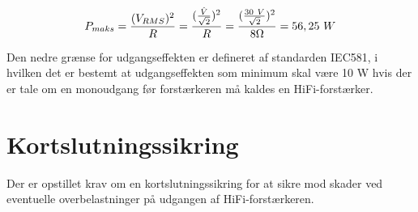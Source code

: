 \begin{equation}
\label{equ:maks_effekt}
P_{maks} = \frac{(V_{RMS})^2}{R}= \frac{(\frac{\hat{V}}{\sqrt{2}})^2}{R} = \frac{(\frac{30~V}{\sqrt{2}})^2}{8\ohm} = 56,25~W
\end{equation}

Den nedre grænse for udgangseffekten er defineret af standarden IEC581, i hvilken det er bestemt at udgangseffekten som minimum skal være 10 W hvis der er tale om en monoudgang før forstærkeren må kaldes en HiFi-forstærker.



\section{Kortslutningssikring}
\label{krav_kortslutningssikring}
Der er opstillet krav om en kortslutningssikring for at sikre mod skader ved eventuelle overbelastninger på udgangen af HiFi-forstærkeren.